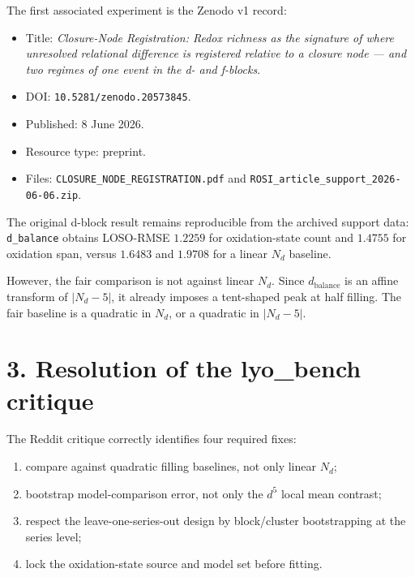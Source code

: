 The first associated experiment is the Zenodo v1 record:

\begin{itemize}
\tightlist
\item
  Title: \emph{Closure-Node Registration: Redox richness as the
  signature of where unresolved relational difference is registered
  relative to a closure node --- and two regimes of one event in the d-
  and f-blocks}.
\item
  DOI: \texttt{10.5281/zenodo.20573845}.
\item
  Published: 8 June 2026.
\item
  Resource type: preprint.
\item
  Files: \texttt{CLOSURE\_NODE\_REGISTRATION.pdf} and
  \texttt{ROSI\_article\_support\_2026-06-06.zip}.
\end{itemize}

The original d-block result remains reproducible from the archived
support data: \texttt{d\_balance} obtains LOSO-RMSE \(1.2259\) for
oxidation-state count and \(1.4755\) for oxidation span, versus
\(1.6483\) and \(1.9708\) for a linear \(N_d\) baseline.

However, the fair comparison is not against linear \(N_d\). Since
\(d_{\mathrm{balance}}\) is an affine transform of \(|N_d-5|\), it
already imposes a tent-shaped peak at half filling. The fair baseline is
a quadratic in \(N_d\), or a quadratic in \(|N_d-5|\).

\section{3. Resolution of the lyo\_bench
critique}\label{resolution-of-the-lyo_bench-critique}

The Reddit critique correctly identifies four required fixes:

\begin{enumerate}
\def\labelenumi{\arabic{enumi}.}
\tightlist
\item
  compare against quadratic filling baselines, not only linear \(N_d\);
\item
  bootstrap model-comparison error, not only the \(d^5\) local mean
  contrast;
\item
  respect the leave-one-series-out design by block/cluster bootstrapping
  at the series level;
\item
  lock the oxidation-state source and model set before fitting.
\end{enumerate}

